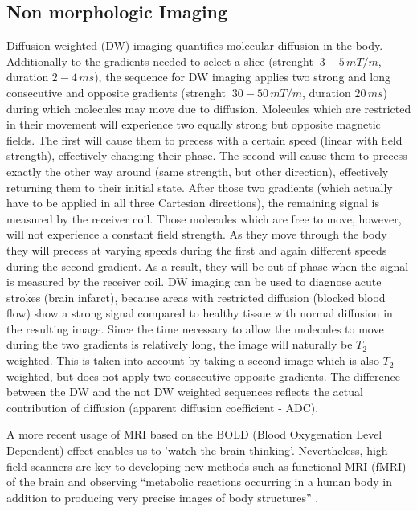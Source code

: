 \subsection{Non morphologic Imaging}


Diffusion weighted (DW) imaging quantifies molecular diffusion in the body.
Additionally to the gradients needed to select a slice (strenght $~3-5\, mT/m$, duration $2-4\, ms$), the sequence for DW imaging applies two strong and long consecutive and opposite gradients (strenght $~30-50\, mT/m$, duration $20\, ms$) during which molecules may move due to diffusion.
Molecules which are restricted in their movement will experience two equally strong but opposite magnetic fields.
The first will cause them to precess with a certain speed (linear with field strength), effectively changing their phase.
The second will cause them to precess exactly the other way around (same strength, but other direction), effectively returning them to their initial state.
After those two gradients (which actually have to be applied in all three Cartesian directions), the remaining signal is measured by the receiver coil.
Those molecules which are free to move, however, will not experience a constant field strength.
As they move through the body they will precess at varying speeds during the first and again different speeds during the second gradient.
As a result, they will be out of phase when the signal is measured by the receiver coil.
DW imaging can be used to diagnose acute strokes (brain infarct), because areas with restricted diffusion (blocked blood flow) show a strong signal compared to healthy tissue with normal diffusion in the resulting image.
Since the time necessary to allow the molecules to move during the two gradients is relatively long, the image will naturally be $T_2$ weighted.
This is taken into account by taking a second image which is also $T_2$ weighted, but does not apply two consecutive opposite gradients.
The difference between the DW and the not DW weighted sequences reflects the actual contribution of diffusion (apparent diffusion
coefficient - ADC).


A more recent usage of MRI based on the BOLD (Blood Oxygenation Level Dependent) effect enables us to 'watch the brain thinking'.
Nevertheless, high field scanners are key to developing new methods such as functional MRI (fMRI) of the brain \cite{Duyn2012} and observing ``metabolic reactions occurring in a human body in addition to producing very precise images of body structures'' \cite{Wada2010}.

